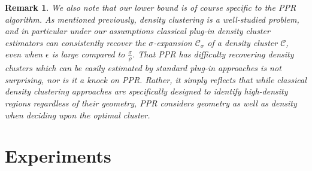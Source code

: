 \documentclass[11pt,twoside]{article}
\newtheorem*{remark}{Remark}
\newcommand{\1}{\mathbf{1}}
\newcommand{\Xbf}{X}             %
\newcommand{\Cset}{\mathcal{C}}
\newcommand{\Csig}{\Cset_{\sigma}}
\begin{document}

\begin{remark}
	We also note that our lower bound is of course specific to the PPR algorithm. As mentioned previously, density clustering is a well-studied problem, and in particular under our assumptions classical plug-in density cluster estimators can consistently recover the $\sigma$-expansion $\Csig$ of a density cluster $\Cset$, even when $\epsilon$ is large compared to $\frac{\sigma}{\rho}$. That PPR has difficulty recovering density clusters which can be easily estimated by standard plug-in approaches is not surprising, nor is it a knock on PPR. Rather, it simply reflects that while classical density clustering approaches are specifically designed to identify high-density regions regardless of their geometry, PPR considers geometry as well as density when deciding upon the optimal cluster.
\end{remark}

\section{Experiments}
\label{sec: experiments}
\end{document}
